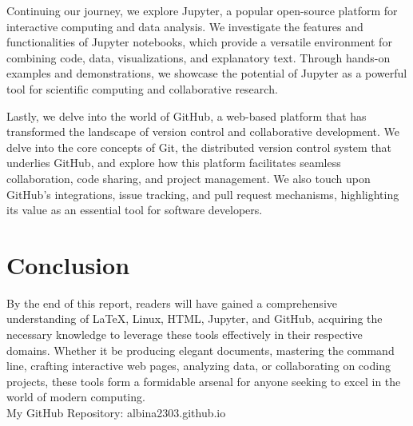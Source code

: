 \documentclass{report}
\begin{document}
Continuing our journey, we explore Jupyter, a popular open-source platform for interactive computing and data analysis. We investigate the features and functionalities of Jupyter notebooks, which provide a versatile environment for combining code, data, visualizations, and explanatory text. Through hands-on examples and demonstrations, we showcase the potential of Jupyter as a powerful tool for scientific computing and collaborative research.

Lastly, we delve into the world of GitHub, a web-based platform that has transformed the landscape of version control and collaborative development. We delve into the core concepts of Git, the distributed version control system that underlies GitHub, and explore how this platform facilitates seamless collaboration, code sharing, and project management. We also touch upon GitHub's integrations, issue tracking, and pull request mechanisms, highlighting its value as an essential tool for software developers.

\chapter{Conclusion}

By the end of this report, readers will have gained a comprehensive understanding of LaTeX, Linux, HTML, Jupyter, and GitHub, acquiring the necessary knowledge to leverage these tools effectively in their respective domains. Whether it be producing elegant documents, mastering the command line, crafting interactive web pages, analyzing data, or collaborating on coding projects, these tools form a formidable arsenal for anyone seeking to excel in the world of modern computing.
\\My GitHub Repository:
albina2303.github.io
\end{document}
